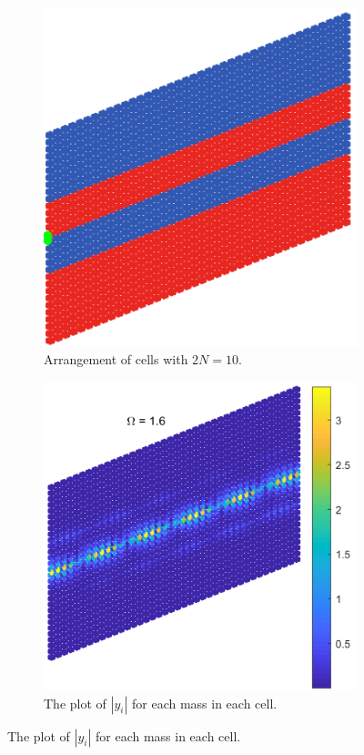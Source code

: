 \begin{figure}
\centering
\begin{subfigure}[b]{.5\textwidth}
  \centering
  \includegraphics[width=0.7\linewidth]{imgs/svbthickarr.png}
  \caption{Arrangement of cells with $2N=10$.}
  \label{fig:sub1}
\end{subfigure}%
\begin{subfigure}[b]{.5\textwidth}
  \centering
  \includegraphics[width=0.9\linewidth]{imgs/svbthickscat.png}
  \caption{The plot of $|y_i|$ for each mass in each cell.}
  \label{fig:sub2}
\end{subfigure}


\end{figure}
